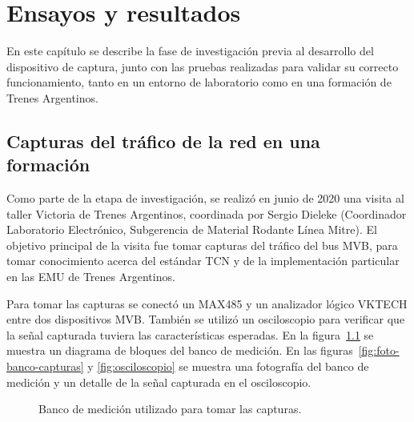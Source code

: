 \chapter{Ensayos y resultados}

\label{cap:EnsayosResultados}

En este capítulo se describe la fase de investigación previa al desarrollo del dispositivo de captura, junto con las pruebas realizadas para validar su correcto funcionamiento, tanto en un entorno de laboratorio como en una formación de Trenes Argentinos.

\section{Capturas del tráfico de la red en una formación}
\label{sec:capturas}

Como parte de la etapa de investigación, se realizó en junio de 2020 una visita al taller Victoria de Trenes Argentinos, coordinada por Sergio Dieleke (Coordinador Laboratorio Electrónico, Subgerencia de Material Rodante Línea Mitre). El objetivo principal de la visita fue tomar capturas del tráfico del bus MVB, para tomar conocimiento acerca del estándar TCN y de la implementación particular en las EMU de Trenes Argentinos.

Para tomar las capturas se conectó un MAX485 y un analizador lógico VKTECH entre dos dispositivos MVB.
También se utilizó un osciloscopio para verificar que la señal capturada tuviera las características esperadas.
En la figura~\ref{fig:banco-capturas} se muestra un diagrama de bloques del banco de medición.
En las figuras~\ref{fig:foto-banco-capturas} y \ref{fig:osciloscopio} se muestra una fotografía del banco de medición y un detalle de la señal capturada en el osciloscopio.

\begin{figure}[htbp]
	\centering
    {
        \fontsize{9pt}{9pt}\selectfont
        
    }
	\caption{Banco de medición utilizado para tomar las capturas.}
    \label{fig:banco-capturas}
\end{figure}

